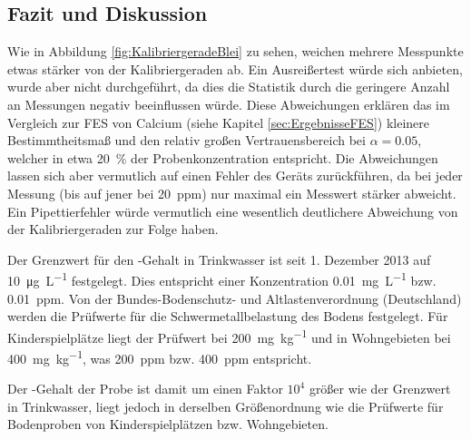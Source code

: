 \subsection{Fazit und Diskussion}
  
  Wie in Abbildung \ref{fig:KalibriergeradeBlei} zu sehen, weichen mehrere Messpunkte etwas stärker von der Kalibriergeraden ab. Ein Ausreißertest würde sich anbieten, wurde aber nicht durchgeführt, da dies die Statistik durch die geringere Anzahl an Messungen negativ beeinflussen würde. Diese Abweichungen erklären das im Vergleich zur FES von Calcium (siehe Kapitel \ref{sec:ErgebnisseFES}) kleinere Bestimmtheitsmaß und den relativ großen Vertrauensbereich bei $\alpha = 0.05$, welcher in etwa \SI[mode=text]{20}{\percent} der Probenkonzentration entspricht. Die Abweichungen lassen sich aber vermutlich auf einen Fehler des Geräts zurückführen, da bei jeder Messung (bis auf jener bei \SI[mode=text]{20}{ppm}) nur maximal ein Messwert stärker abweicht. Ein Pipettierfehler würde vermutlich eine wesentlich deutlichere Abweichung von der Kalibriergeraden zur Folge haben. 
  
  Der Grenzwert für den -Gehalt in Trinkwasser ist seit 1. Dezember 2013 auf \SI[mode=text]{10}{\micro\gram\per\liter} festgelegt. Dies entspricht einer Konzentration \SI[mode=text]{0.01}{\milli\gram\per\liter} bzw. \SI[mode=text]{0.01}{ppm}.\citep{UmweltbundesamtBlei} Von der Bundes-Bodenschutz- und Altlastenverordnung (Deutschland) werden die Prüfwerte für die Schwermetallbelastung des Bodens festgelegt. Für Kinderspielplätze liegt der Prüfwert bei \SI[mode=text]{200}{\milli\gram\per\kilo\gram} und in Wohngebieten bei \SI[mode=text]{400}{\milli\gram\per\kilo\gram}, was  \SI[mode=text]{200}{ppm} bzw. \SI[mode=text]{400}{ppm} entspricht.\citep{BodenBlei} 
  
  Der -Gehalt der Probe ist damit um einen Faktor $10^4$ größer wie der Grenzwert in Trinkwasser, liegt jedoch in derselben Größenordnung wie die Prüfwerte für Bodenproben von Kinderspielplätzen bzw. Wohngebieten.